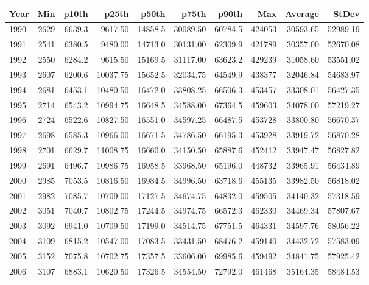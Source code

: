 \documentclass[
]{book}
\begin{document}
\begin{tabular}{l|r|r|r|r|r|r|r|r|r}
\hline
Year & Min & p10th & p25th & p50th & p75th & p90th & Max & Average & StDev\\
\hline
1990 & 2629 & 6639.3 & 9617.50 & 14858.5 & 30089.50 & 60784.5 & 424053 & 30593.65 & 52989.19\\
\hline
1991 & 2541 & 6380.5 & 9480.00 & 14713.0 & 30131.00 & 62309.9 & 421789 & 30357.00 & 52670.08\\
\hline
1992 & 2550 & 6284.2 & 9615.50 & 15169.5 & 31117.00 & 63623.2 & 429239 & 31058.60 & 53551.02\\
\hline
1993 & 2607 & 6200.6 & 10037.75 & 15652.5 & 32034.75 & 64549.9 & 438377 & 32046.84 & 54683.97\\
\hline
1994 & 2681 & 6453.1 & 10480.50 & 16472.0 & 33808.25 & 66506.3 & 453457 & 33308.01 & 56427.35\\
\hline
1995 & 2714 & 6543.2 & 10994.75 & 16648.5 & 34588.00 & 67364.5 & 459603 & 34078.00 & 57219.27\\
\hline
1996 & 2724 & 6522.6 & 10827.50 & 16551.0 & 34597.25 & 66487.5 & 453728 & 33800.80 & 56670.37\\
\hline
1997 & 2698 & 6585.3 & 10966.00 & 16671.5 & 34786.50 & 66195.3 & 453928 & 33919.72 & 56870.28\\
\hline
1998 & 2701 & 6629.7 & 11008.75 & 16660.0 & 34150.50 & 65887.6 & 452412 & 33947.47 & 56827.82\\
\hline
1999 & 2691 & 6496.7 & 10986.75 & 16958.5 & 33968.50 & 65196.0 & 448732 & 33965.91 & 56434.89\\
\hline
2000 & 2985 & 7053.5 & 10816.50 & 16984.5 & 34996.50 & 63718.6 & 455135 & 33982.50 & 56818.02\\
\hline
2001 & 2982 & 7085.7 & 10709.00 & 17127.5 & 34674.75 & 64832.0 & 459505 & 34140.32 & 57318.59\\
\hline
2002 & 3051 & 7040.7 & 10802.75 & 17244.5 & 34974.75 & 66572.3 & 462330 & 34469.34 & 57807.67\\
\hline
2003 & 3092 & 6941.0 & 10709.50 & 17199.0 & 34514.75 & 67751.5 & 464331 & 34597.76 & 58056.22\\
\hline
2004 & 3109 & 6815.2 & 10547.00 & 17083.5 & 33431.50 & 68476.2 & 459140 & 34432.72 & 57583.09\\
\hline
2005 & 3152 & 7075.8 & 10702.75 & 17357.5 & 33606.00 & 69985.6 & 459492 & 34841.75 & 57925.42\\
\hline
2006 & 3107 & 6883.1 & 10620.50 & 17326.5 & 34554.50 & 72792.0 & 461468 & 35164.35 & 58484.53\\

\end{tabular}
\end{document}

